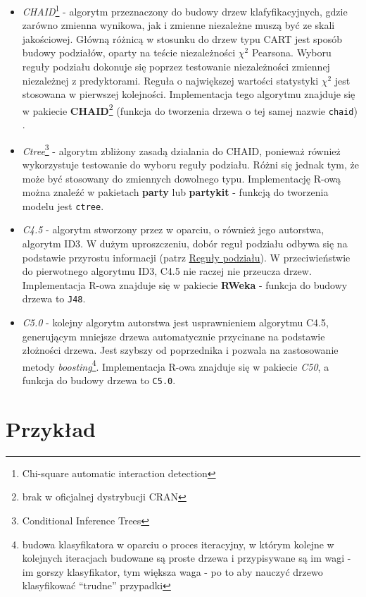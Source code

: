 \documentclass[]{book}
\providecommand{\tightlist}{%
  \setlength{\itemsep}{0pt}\setlength{\parskip}{0pt}}
\let\rmarkdownfootnote\footnote%
\def\footnote{\protect\rmarkdownfootnote}
\theoremstyle{plain}
\theoremstyle{definition}
\begin{document}
\begin{itemize}
\tightlist
\item
  \emph{CHAID}\footnote{Chi-square automatic interaction detection} - algorytm przeznaczony do budowy drzew klafyfikacyjnych, gdzie zarówno zmienna wynikowa, jak i zmienne niezależne muszą być ze skali jakościowej. Główną różnicą w stosunku do drzew typu CART jest sposób budowy podziałów, oparty na teście niezależności \(\chi^2\) Pearsona. Wyboru reguły podziału dokonuje się poprzez testowanie niezależności zmiennej niezależnej z predyktorami. Reguła o największej wartości statystyki \(\chi^2\) jest stosowana w pierwszej kolejności. Implementacja tego algorytmu znajduje się w pakiecie \textbf{CHAID}\footnote{brak w oficjalnej dystrybucji CRAN} (funkcja do tworzenia drzewa o tej samej nazwie \texttt{chaid}) \citep{R-CHAID}.
\item
  \emph{Ctree}\footnote{Conditional Inference Trees} - algorytm zbliżony zasadą dzialania do CHAID, ponieważ również wykorzystuje testowanie do wyboru reguły podziału. Różni się jednak tym, że może być stosowany do zmiennych dowolnego typu. Implementację R-ową można znaleźć w pakietach \textbf{party} \citep{R-party} lub \textbf{partykit} \citep{R-partykit} - funkcją do tworzenia modelu jest \texttt{ctree}.
\item
  \emph{C4.5} - algorytm stworzony przez \citet{quinlan1993} w oparciu, o również jego autorstwa, algorytm ID3. W dużym uproszczeniu, dobór reguł podziału odbywa się na podstawie przyrostu informacji (patrz \protect\hyperlink{reguy-podziau}{Reguły podziału}). W przeciwieństwie do pierwotnego algorytmu ID3, C4.5 nie raczej nie przeucza drzew. Implementacja R-owa znajduje się w pakiecie \textbf{RWeka} \citep{R-Rweka} - funkcja do budowy drzewa to \texttt{J48}.
\item
  \emph{C5.0} - kolejny algorytm autorstwa \citet{R-C50} jest usprawnieniem algorytmu C4.5, generującym mniejsze drzewa automatycznie przycinane na podstawie złożności drzewa. Jest szybszy od poprzednika i pozwala na zastosowanie metody \emph{boosting}\footnote{budowa klasyfikatora w oparciu o proces iteracyjny, w którym kolejne w kolejnych iteracjach budowane są proste drzewa i przypisywane są im wagi - im gorszy klasyfikator, tym większa waga - po to aby nauczyć drzewo klasyfikować ``trudne'' przypadki}. Implementacja R-owa znajduje się w pakiecie \emph{C50}, a funkcja do budowy drzewa to \texttt{C5.0}.
\end{itemize}

\hypertarget{przyk42}{%
\section{Przykład}\label{przyk42}}
\end{document}
